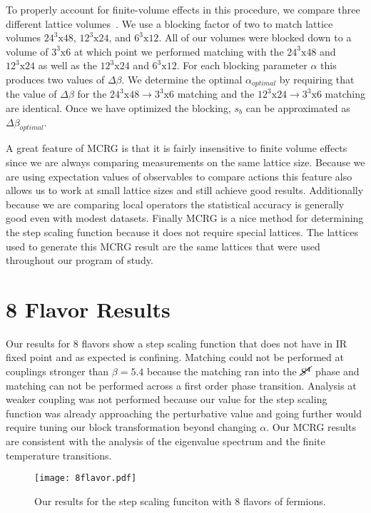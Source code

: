 \documentclass{PoS}
\newcommand{\Sb}{\ensuremath{\cancel{S^4}} }
\begin{document}
To properly account for finite-volume effects in this procedure, we compare three different lattice volumes~\cite{Hasenfratz:2011xn}.
We use a blocking factor of two to match lattice volumes $24^3\mbox{x}48$, $12^3\mbox{x}24$, and $6^3\mbox{x}12$.
All of our volumes were blocked down to a volume of $3^3\mbox{x}6$ at which point we performed matching with the $24^3\mbox{x}48$ and $12^3\mbox{x}24$ as well as the $12^3\mbox{x}24$ and $6^3\mbox{x}12$.
For each blocking parameter $\alpha$ this produces two values of $\Delta\beta$.
We determine the optimal $\alpha_{optimal}$ by requiring that the value of $\Delta\beta$ for the $24^3\mbox{x}48\to3^3\mbox{x}6$ matching and the $12^3\mbox{x}24\to3^3\mbox{x}6$ matching are identical.
Once we have optimized the blocking, $s_b$ can be approximated as $\Delta\beta_{optimal}$.

A great feature of MCRG is that it is fairly insensitive to finite volume effects since we are always comparing measurements on the same lattice size.
Because we are using expectation values of observables to compare actions this feature also allows us to work at small lattice sizes and still achieve good results.
Additionally because we are comparing local operators the statistical accuracy is generally good even with modest datasets.
Finally MCRG is a nice method for determining the step scaling function because it does not require special lattices.
The lattices used to generate this MCRG result are the same lattices that were used throughout our program of study.

\section{\label{sec:8flavor}8 Flavor Results}
Our results for 8 flavors show a step scaling function that does not have in IR fixed point and as expected is confining.
Matching could not be performed at couplings stronger than $\beta = 5.4$ because the matching ran into the \Sb phase and matching can not be performed across a first order phase transition.
Analysis at weaker coupling was not performed because our value for the step scaling function was already approaching the perturbative value and going further would require tuning our block transformation beyond changing $\alpha$.  
Our MCRG results are consistent with the analysis of the eigenvalue spectrum and the finite temperature transitions.

\begin{figure}[htpb]
  \centering
  \texttt{[image: 8flavor.pdf]}
  \caption{Our results for the step scaling funciton with 8 flavors of fermions.}
  \label{fig:8flavor}
\end{figure}
\end{document}
